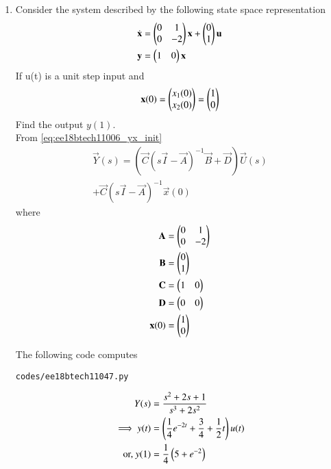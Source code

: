 \begin{enumerate}[label=\thesubsection.\arabic*.,ref=\thesubsection.\theenumi]

\item
Consider the system described by the following state space representation  
\begin{align}
\dot{\mathbf{ x}}&=\begin{pmatrix}0&1\\0&-2\end{pmatrix}\mathbf{x} + \begin{pmatrix}0\\1\end{pmatrix}\mathbf{u}\\  
\mathbf{y} &= \begin{pmatrix}1&0\end{pmatrix}\mathbf{x}
\end{align}
If u(t) is a unit step input and 
\begin{align}
\mathbf{x}(0)=\begin{pmatrix}x_{1}(0)\\x_{2}(0)\end{pmatrix}=\begin{pmatrix}1\\0\end{pmatrix}
\end{align}
Find the output $y(1)$.
\\
\solution From \ref{eq:ee18btech11006_yx_init}
%
%
\begin{multline}
\vec{Y}(s)=( \vec{C}{(s\vec{I}-\vec{A})^{-1}}\vec{B}+\vec{D}) \vec{U}(s) 
\\
+ \vec{C}(s\vec{I}-\vec{A})^{-1}\vec{x}(0)
\label{eq:ee18btech11006_yx_init}
\end{multline}
%
where
\begin{align}
\mathbf{A}&=\begin{pmatrix}0&1\\0&-2\end{pmatrix}\\
\mathbf{B}&=\begin{pmatrix}0\\1\end{pmatrix}\\
\mathbf{C}&=\begin{pmatrix}1&0\end{pmatrix}\\
\mathbf{D}&=\begin{pmatrix}0&0\end{pmatrix}\\
\mathbf{x}(0)&=\begin{pmatrix}1\\0\end{pmatrix}
\end{align}
%

The following code computes 
\begin{lstlisting}
codes/ee18btech11047.py
\end{lstlisting}
\begin{align}
{Y}(s)&=\frac{s^{2}+2s+1}{s^{3}+2s^{2}}
\\
\implies y(t)&=\left(\frac{1}{4}e^{-2t}+\frac{3}{4}+\frac{1}{2}t\right)u(t)
\\
\text{or, } y(1) &= \frac{1}{4}\left(5 + e^{-2}\right)
\end{align}
\end{enumerate}
